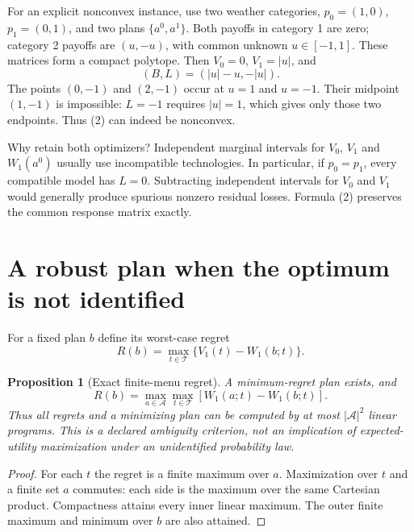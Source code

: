 \documentclass[11pt]{article}
\newtheorem{proposition}[theorem]{Proposition}
\begin{document}
For an explicit nonconvex instance, use two weather categories,
$p_0=(1,0)$, $p_1=(0,1)$, and two plans $\{a^0,a^1\}$.
Both payoffs in category 1 are zero; category 2 payoffs are $(u,-u)$,
with common unknown $u\in[-1,1]$. These matrices form a compact polytope.
Then $V_0=0$, $V_1=|u|$, and
\[
 (B,L)=(|u|-u,-|u|).
\]
The points $(0,-1)$ and $(2,-1)$ occur at $u=1$ and $u=-1$.
Their midpoint $(1,-1)$ is impossible: $L=-1$ requires $|u|=1$,
which gives only those two endpoints. Thus (2) can indeed be nonconvex.

Why retain both optimizers? Independent marginal intervals for $V_0$,
$V_1$ and $W_1(a^0)$ usually use incompatible technologies. In particular,
if $p_0=p_1$, every compatible model has $L=0$. Subtracting independent
intervals for $V_0$ and $V_1$ would generally produce spurious nonzero
residual losses. Formula (2) preserves the common response matrix exactly.

\section{A robust plan when the optimum is not identified}
For a fixed plan $b$ define its worst-case regret
\[
 R(b)=\max_{t\in\mathcal T}\{V_1(t)-W_1(b;t)\}.
\]
\begin{proposition}[Exact finite-menu regret]
A minimum-regret plan exists, and
\[
 R(b)=\max_{a\in\mathcal A}\max_{t\in\mathcal T}
                          [W_1(a;t)-W_1(b;t)].              \tag{3}
\]
Thus all regrets and a minimizing plan can be computed by at most
$|\mathcal A|^2$ linear programs. This is a declared ambiguity criterion,
not an implication of expected-utility maximization under an unidentified
probability law.
\end{proposition}
\begin{proof}
For each $t$ the regret is a finite maximum over $a$. Maximization over
$t$ and a finite set $a$ commutes: each side is the maximum over the same
Cartesian product. Compactness attains every inner linear maximum. The
outer finite maximum and minimum over $b$ are also attained.
\end{proof}
\end{document}
